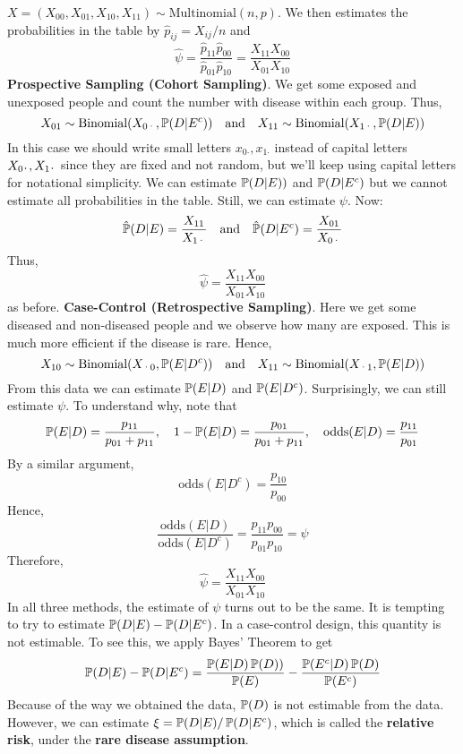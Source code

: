 \(X = (X_{00}, X_{01}, X_{10}, X_{11}) \sim \text{Multinomial}(n, p)\). 
We then estimates the probabilities in the table by 
\(\hat{p}_{ij} = X_{ij} / n\) and
\[
\hat{\psi} = \frac{\hat{p}_{11} \hat{p}_{00}}{\hat{p}_{01} \hat{p}_{10}} = \frac{X_{11} X_{00}}{X_{01} X_{10}}
\]
\textbf{Prospective Sampling (Cohort Sampling)}. We get some exposed and
unexposed people and count the number with disease within each group.
Thus,
\[
X_{01} \sim \text{Binomial}(X_{0\text{·}}, \operatorname{\mathbb{P}}(D | E^{c}))
\quad \text{and} \quad
X_{11} \sim \text{Binomial}(X_{1\text{·}}, \operatorname{\mathbb{P}}(D | E))
\]
In this case we should write small letters
\(x_{0\text{·}},  x_{1\text{·}}\) instead of capital letters $
X_{0\placeholder}, X_{1\placeholder}$ since they are fixed and not
random, but we'll keep using capital letters for notational simplicity.
We can estimate \(\operatorname{\mathbb{P}}(D | E))\) and \(\operatorname{\mathbb{P}}(D | E^{c})\) but
we cannot estimate all probabilities in the table. Still, we can
estimate \(\psi\). Now:
\[
\hat{\operatorname{\mathbb{P}}}(D | E) = \frac{X_{11}}{X_{1\text{·}}}
\quad \text{and} \quad
\hat{\operatorname{\mathbb{P}}}(D | E^{c}) = \frac{X_{01}}{X_{0\text{·}}}
\]
Thus,
\[
\hat{\psi} = \frac{X_{11} X_{00}}{X_{01} X_{10}}
\]
as before.
\textbf{Case-Control (Retrospective Sampling)}. Here we get some
diseased and non-diseased people and we observe how many are exposed.
This is much more efficient if the disease is rare. Hence,
\[
X_{10} \sim \text{Binomial}(X_{\text{·}0}, \operatorname{\mathbb{P}}(E | D^{c}))
\quad \text{and} \quad
X_{11} \sim \text{Binomial}(X_{\text{·}1}, \operatorname{\mathbb{P}}(E | D))
\]
From this data we can estimate \(\operatorname{\mathbb{P}}(E | D)\) and
\(\operatorname{\mathbb{P}}(E | D^{c})\). Surprisingly, we can still estimate \(\psi\).
To understand why, note that
\[
\operatorname{\mathbb{P}}(E | D) = \frac{p_{11}}{p_{01} + p_{11}},
\quad 1 - \operatorname{\mathbb{P}}(E | D) = \frac{p_{01}}{p_{01} + p_{11}},
\quad \text{odds}(E | D) = \frac{p_{11}}{p_{01}}
\]
By a similar argument,
\[
\text{odds}(E | D^{c}) = \frac{p_{10}}{p_{00}}
\]
Hence,
\[
\frac{\text{odds}(E | D)}{\text{odds}(E | D^{c})} = \frac{p_{11} p_{00}}{p_{01} p_{10}} = \psi
\]
Therefore,
\[
\hat{\psi} = \frac{X_{11} X_{00}}{X_{01} X_{10}}
\]
In all three methods, the estimate of \(\psi\) turns out to be the same.
It is tempting to try to estimate
\(\operatorname{\mathbb{P}}(D | E) - \operatorname{\mathbb{P}}(D | E^{c})\). In a case-control design,
this quantity is not estimable. To see this, we apply Bayes' Theorem to
get
\[
\operatorname{\mathbb{P}}(D | E) - \operatorname{\mathbb{P}}(D | E^{c}) = \frac{\operatorname{\mathbb{P}}(E | D) \operatorname{\mathbb{P}}(D))}{\operatorname{\mathbb{P}}(E)} - \frac{\operatorname{\mathbb{P}}(E^{c} | D) \operatorname{\mathbb{P}}(D)}{\operatorname{\mathbb{P}}(E^{c})}
\]
Because of the way we obtained the data, \(\operatorname{\mathbb{P}}(D)\) is not
estimable from the data.
However, we can estimate
\(\xi = \operatorname{\mathbb{P}}(D | E) / \operatorname{\mathbb{P}}(D | E^{c})\), which is called the
\textbf{relative risk}, under the \textbf{rare disease assumption}.

